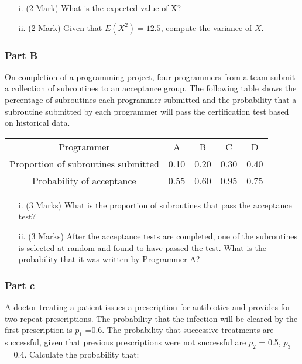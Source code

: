 \documentclass[a4paper,12pt]{article}
\begin{document}
\begin{itemize}
\item[i.] (2 Mark) What is the expected value of X?
\item[ii.] (2 Mark) Given that $E(X^2) = 12.5$, compute the variance of $X$.
\end{itemize}


\subsubsection*{Part B}
On completion of a programming project, four programmers from a team submit a collection of subroutines to an acceptance group. The following table shows the percentage of subroutines each programmer submitted and the probability that a subroutine submitted by each programmer will pass the certification test based on historical data.


\begin{center}
\begin{tabular}{|c||c|c|c|c|}
\hline
Programmer	&A	&B	&C	&D\\
Proportion of subroutines submitted &	0.10&	0.20&	0.30&	0.40\\
Probability of acceptance	&0.55	&0.60	&0.95&	0.75\\
\hline
\end{tabular}
\end{center}


\begin{itemize}
\item[i.](3 Marks) What is the proportion of subroutines that pass the acceptance test?
\item[ii.](3 Marks) After the acceptance tests are completed, one of the subroutines is selected at random and found to have passed the test. What is the probability that it was written by Programmer A?
\end{itemize}

\subsubsection*{Part c} %
A doctor treating a patient issues a prescription for antibiotics and provides for two repeat prescriptions. The probability that the infection will be cleared by the first prescription is $p_1$ =0.6.
The probability that successive treatments are successful, given that previous prescriptions were not successful are $p_2$ = 0.5, $p_3$ = 0.4. Calculate the probability that:
\end{document}

